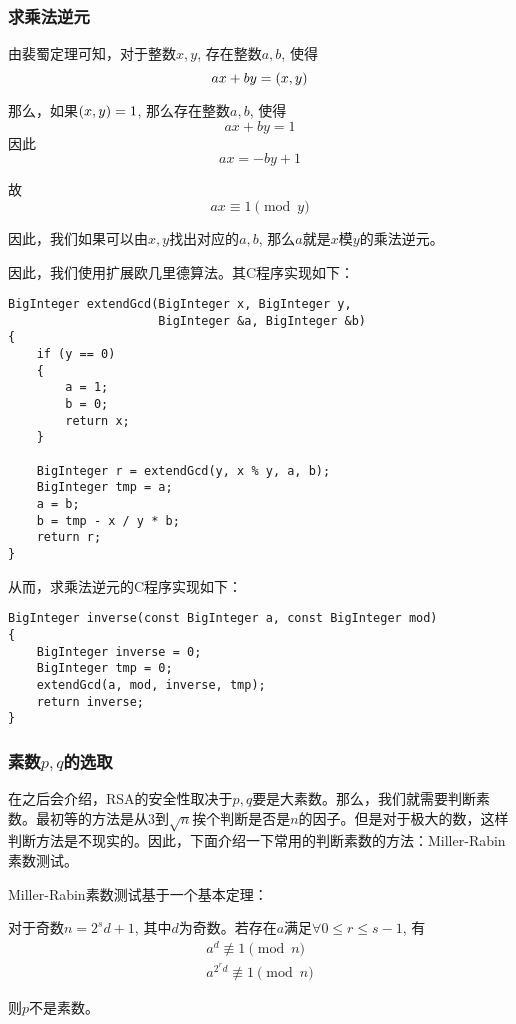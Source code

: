 \subsubsection{求乘法逆元}
由裴蜀定理可知，对于整数$x, y$, 存在整数$a, b$, 使得
\begin{equation}
ax+by=\left( {x, y}\right)
\end{equation}

那么，如果$\left( {x,y}\right) = 1$, 那么存在整数$a, b$, 使得
\begin{equation}
ax+by=1
\end{equation}
因此
\[ax=-by+1\]

故
\begin{equation}
ax\equiv 1\pmod{y}
\end{equation}

因此，我们如果可以由$x, y$找出对应的$a, b$, 那么$a$就是$x$模$y$的乘法逆元。\par
因此，我们使用扩展欧几里德算法。其C程序实现如下：
\begin{prove}
\begin{verbatim}
BigInteger extendGcd(BigInteger x, BigInteger y,
                     BigInteger &a, BigInteger &b)
{
    if (y == 0)
    {
        a = 1;
        b = 0;
        return x;
    }
    
    BigInteger r = extendGcd(y, x % y, a, b);
    BigInteger tmp = a;
    a = b;
    b = tmp - x / y * b;
    return r;
}
\end{verbatim}
\end{prove}

从而，求乘法逆元的C程序实现如下：
\begin{prove}
\begin{verbatim}
BigInteger inverse(const BigInteger a, const BigInteger mod)
{
    BigInteger inverse = 0;
    BigInteger tmp = 0;
    extendGcd(a, mod, inverse, tmp);
    return inverse;
}
\end{verbatim}
\end{prove}
\subsubsection{素数$p, q$的选取}
在之后会介绍，RSA的安全性取决于$p, q$要是大素数。那么，我们就需要判断素数。最初等的方法是从$3$到$\sqrt{n}$挨个判断是否是$n$的因子。但是对于极大的数，这样判断方法是不现实的。因此，下面介绍一下常用的判断素数的方法：Miller-Rabin素数测试。\par
Miller-Rabin素数测试基于一个基本定理：
\begin{theorem}
对于奇数$n=2^sd+1$, 其中$d$为奇数。若存在$a$满足$\forall 0\leq r\leq s-1$, 有
\begin{gather}
a^d\not\equiv 1\pmod{n}\\
a^{2^rd}\not\equiv 1\pmod{n}
\end{gather}

则$p$不是素数。
\end{theorem}

